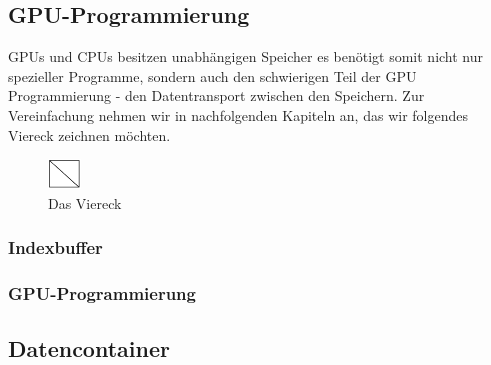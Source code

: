 \begin{Spacing}{\mylinespace}
\subsection{GPU-Programmierung}
GPUs und CPUs besitzen unabhängigen Speicher es benötigt somit nicht nur spezieller Programme, sondern auch den schwierigen Teil der GPU Programmierung - den Datentransport zwischen den Speichern.
Zur Vereinfachung nehmen wir in nachfolgenden Kapiteln an, das wir folgendes Viereck zeichnen möchten.

\begin{figure}[h!]
	\vspace*{100px}
	\includegraphics[height=30px]{graphics/quad.png}	
	\caption{Das Viereck}
	\label{fig:Viereck}
\end{figure}

\subsubsection{Indexbuffer}

\subsubsection{GPU-Programmierung}

\subsection{Datencontainer}
\end{Spacing}
\clearpage
